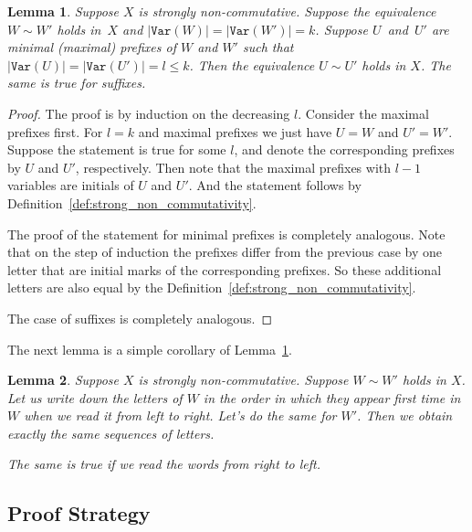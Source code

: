 \documentclass[11pt,letterpaper]{article}
\newtheorem{lemma}{Lemma}
\newcommand{\var}{\texttt{Var}}
\begin{document}
\begin{lemma} \label{lem:prefix_equivalence}
Suppose $X$ is strongly non-commutative. Suppose the equivalence $W \sim W'$
holds in~$X$ and $|\var(W)|=|\var(W')|=k$. Suppose $U$~and~$U'$ are minimal
(maximal) prefixes of $W$ and $W'$ such that $|\var(U)| = |\var(U')| = l\leq k$.
Then the equivalence $U \sim U'$ holds in $X$. The same is true for suffixes.
\end{lemma}

\begin{proof}
The proof is by induction on the decreasing $l$. Consider the maximal prefixes
first. For $l=k$ and maximal prefixes we just have $U=W$ and $U'=W'$. Suppose
the statement is true for some $l$, and denote the corresponding prefixes by $U$
and $U'$, respectively. Then note that the maximal prefixes with $l-1$ variables
are initials of $U$ and $U'$. And the statement follows by
Definition~\ref{def:strong_non_commutativity}.

The proof of the statement for minimal prefixes is completely analogous. Note
that on the step of induction the prefixes differ from the previous case by one
letter that are initial marks of the corresponding prefixes. So these additional
letters are also equal by the Definition~\ref{def:strong_non_commutativity}.

The case of suffixes is completely analogous.
\end{proof}

The next lemma is a simple corollary of Lemma~\ref{lem:prefix_equivalence}.
\begin{lemma} \label{lem:variables_order}
Suppose $X$ is strongly non-commutative. Suppose $W \sim W'$ holds in $X$. Let us write down the letters of $W$ in the order in which they appear first time in $W$ when we read it from left to right. Let's do the same for $W'$. Then we obtain exactly the same sequences of letters.

The same is true if we read the words from right to left.
\end{lemma}

\subsection{Proof Strategy}

\end{document}
